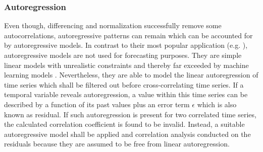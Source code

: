 \subsubsection{Autoregression}
\label{subsubsection:processing:ar_modelling}

Even though, differencing and normalization successfully remove some autocorrelations, autoregressive patterns can remain which can be accounted for by autoregressive models. In contrast to their most popular application (e.g. \citet{Ruiz2012CorrelatingActivity}), autoregressive models are not used for forecasting purposes. They are simple linear models with unrealistic constraints and thereby far exceeded by machine learning models \cite{Hsu2016BridgingEconomists}. Nevertheless, they are able to model the linear autoregression of time series which shall be filtered out before cross-correlating time series. If a temporal variable reveals autoregression, a value within this time series can be described by a function of its past values plus an error term $\epsilon$ which is also known as residual. If such autoregression is present for two correlated time series, the calculated correlation coefficient is found to be invalid. Instead, a suitable autoregressive model shall be applied and correlation analysis conducted on the residuals because they are assumed to be free from linear autoregression.



